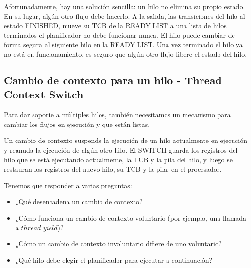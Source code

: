 \documentclass[10pt]{book}
\begin{document}
Afortunadamente, hay una solución sencilla: un hilo no elimina su propio estado. En su lugar, algún otro flujo debe hacerlo. A la salida, las transiciones del hilo al estado FINISHED, mueve su TCB de la READY LIST a una lista de hilos terminados el planificador no debe funcionar nunca. El hilo puede cambiar de forma segura al siguiente hilo en la READY LIST. Una vez terminado el hilo ya no está en funcionamiento, es seguro que algún otro flujo libere el estado del hilo.

\subsection{Cambio de contexto para un hilo - Thread Context Switch}
Para dar soporte a múltiples hilos, también necesitamos un mecanismo para cambiar los flujos en ejecución y que están listas.

Un cambio de contexto suspende la ejecución de un hilo actualmente en ejecución y reanuda la ejecución de algún otro hilo. El SWITCH guarda los registros del hilo que se está ejecutando actualmente, la TCB y la pila del hilo, y luego se restauran los registros del nuevo hilo, su TCB y la pila, en el procesador.

Tenemos que responder a varias preguntas:
\begin{itemize}
\item ¿Qué desencadena un cambio de contexto?
\item ¿Cómo funciona un cambio de contexto voluntario (por ejemplo, una llamada a $thread\_ yield$)?
\item ¿Cómo un cambio de contexto involuntario difiere de uno voluntario?
\item ¿Qué hilo debe elegir el planificador para ejecutar a continuación?
\end{itemize}
\end{document}
